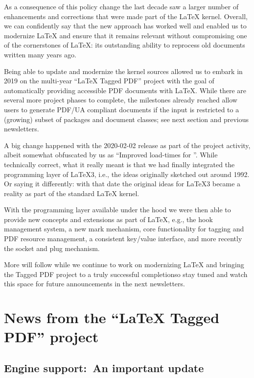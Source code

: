 \documentclass{ltnews}
\providecommand\Dash {\unskip \textemdash}
\providecommand\tubcommand[1]{}
\begin{document}
As a consequence of this policy change the last decade saw a larger
number of enhancements and corrections that were made part of the
\LaTeX{} kernel. Overall, we can confidently say that the new
approach has worked well and enabled us to modernize \LaTeX{} and ensure
that it remains relevant without compromising one of the cornerstones
of \LaTeX{}: its outstanding ability to reprocess old documents
written many years ago.

\tubcommand\newpage
Being able to update and modernize the kernel sources allowed us to
embark in 2019 on the multi-year \enquote{\LaTeX{} Tagged PDF} project
with the goal of automatically providing accessible PDF documents with
\LaTeX{}. While there are several more project phases to complete, the
milestones already reached allow users to generate PDF/UA compliant
documents if the input is restricted to a (growing) subset of packages
and document classes; see next section and previous newsletters.

 A big change happened with the 2020-02-02 release as part of the project activity,
 albeit somewhat obfuscated by us as \enquote{Improved load-times for
   }. While technically correct, what it really meant is
 that we had finally integrated the programming layer of \LaTeX3,
 i.e., the ideas originally sketched out around 1992.  Or saying it
 differently: with that date the original ideas for \LaTeX3 became a
 reality as part of the standard \LaTeX{} kernel.

 With the programming layer available under the hood we were then able to
 provide new concepts and extensions as part of \LaTeX{},
 e.g., the hook management system, a new mark mechanism, core
 functionality for tagging and PDF resource management, a consistent
 key/value interface, and more recently the socket and plug mechanism.

 More will follow while we continue to work on modernizing \LaTeX{} and
 bringing the Tagged PDF project to a truly successful completion\Dash so
 stay tuned and watch this space for future announcements in the next
 newsletters.

 

\section{News from the \enquote{\LaTeX{} Tagged PDF} project}

\subsection{Engine support:\ An important update}
\end{document}
